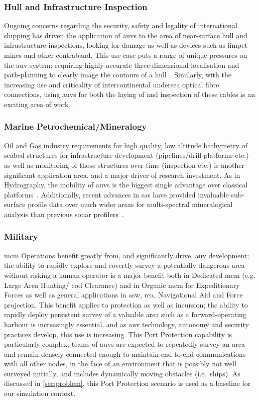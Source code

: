 \subsubsection{Hull and Infrastructure Inspection}
Ongoing concerns regarding the security, safety and legality of international shipping has driven the application of \glspl{auv} to the area of near-surface hull and infrastructure inspections, looking for damage as well as devices such as limpet mines and other contraband.
This use case puts a range of unique pressures on the \gls{auv} system; requiring highly accurate three-dimensional localisation and path-planning to clearly image the contours of a hull~\cite{Nicholson2008}.
Similarly, with the increasing use and criticality of intercontinental undersea optical fibre connections, using \glspl{auv} for both the laying of and inspection of these cables is an exciting area of work~\cite{Yu2004,Asakawa2002}.

\subsubsection{Marine Petrochemical/Mineralogy}
Oil and Gas industry requirements for high quality, low altitude bathymetry of seabed structures for infrastructure development (pipelines/drill platforms etc.) as well as monitoring of those structures over time (inspection etc.) is another significant application area, and a major driver of research investment.
As in Hydrography, the mobility of \glspl{auv} is the biggest single advantage over classical platforms~\cite{Morr2003}.
Additionally, recent advances in \gls{sas} have provided invaluable sub-surface profile data over much wider areas for multi-spectral mineralogical analysis than previous sonar profilers~\cite{Denny2015}.

\subsubsection{Military}
\gls{mcm} Operations benefit greatly from, and significantly drive, \gls{auv} development; the ability to rapidly explore and covertly survey a potentially dangerous area without risking a human operator is a major benefit both in Dedicated \gls{mcm} (e.g. Large Area Hunting/ \gls{eod} Clearance) and in Organic \gls{mcm} for Expeditionary Forces as well as general applications in  \gls{asw}, \gls{rea}, Navigational Aid and Force projection,
This benefit applies to protection as well as incursion; the ability to rapidly deploy persistent survey of a valuable area such as a forward-operating harbour is increasingly essential, and as \gls{auv} technology, autonomy and security practices develop, this use is increasing.
This Port Protection capability is particularly complex;  teams of \glspl{auv} are expected to repeatedly survey an area and remain densely-connected enough to maintain end-to-end communications with all other nodes, in the face of an environment that is possibly not well surveyed initially, and includes dynamically moving obstacles (i.e.\ ships).
As discussed in \autoref{sec:problem}, this Port Protection scenario is used as a baseline for our simulation context.


